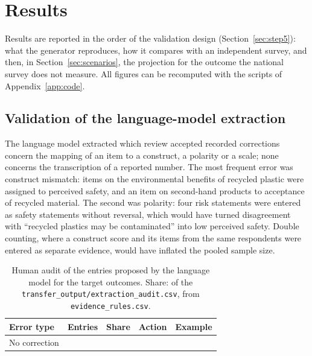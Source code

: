 \section{Results}
\label{sec:results}

Results are reported in the order of the validation design
(Section~\ref{sec:step5}): what the generator reproduces, how it compares with
an independent survey, and then, in Section~\ref{sec:scenarios}, the projection
for the outcome the national survey does not measure. All figures can be
recomputed with the scripts of Appendix~\ref{app:code}.

\subsection{Validation of the language-model extraction}
\label{sec:res_extraction}

The language model extracted %
which %
review accepted %
recorded corrections concern the mapping of an item to a construct, a polarity
or a scale; none concerns the transcription of a reported number. The most
frequent error was construct mismatch: items on the environmental benefits of
recycled plastic were assigned to perceived safety, and an item on second-hand
products to acceptance of recycled material. The second was polarity: four risk
statements were entered as safety statements without reversal, which would
have turned disagreement with ``recycled plastics may be contaminated'' into
low perceived safety. Double counting, where a construct score and its items
from the same respondents were entered as separate evidence, would have
inflated the pooled sample size.

\begin{table}[htbp]
\centering
\caption{Human audit of the entries proposed by the language model for the
target outcomes. Share: of the %
\texttt{transfer\_output/extraction\_audit.csv}, from
\texttt{evidence\_rules.csv}.}
\label{tab:audit}
\small
\begin{tabularx}{\textwidth}{lrrlX}
\toprule
\textbf{Error type} & \textbf{Entries} & \textbf{Share} & \textbf{Action} &
  \textbf{Example} \\
\midrule
\midrule
No correction & %
\bottomrule
\end{tabularx}
\end{table}

